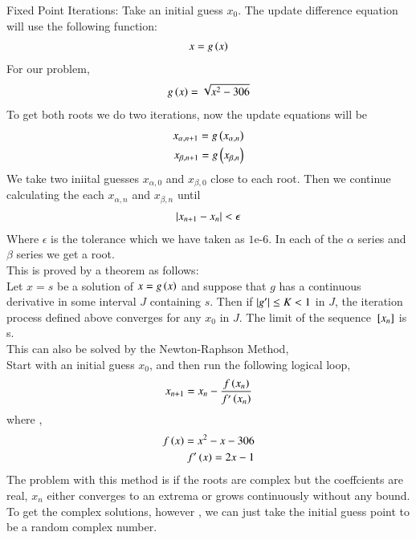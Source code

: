 \documentclass[journal]{IEEEtran}
\begin{document}
Fixed Point Iterations:
Take an initial guess $x_0$. The update difference equation will use the following function:
\begin{align}
    x = g\left(x\right)
\end{align}
For our problem,
\begin{align}
    g\left(x\right) = \sqrt{x^2-306}
\end{align}
To get both roots we do two iterations, now the update equations will be
\begin{align}
    x_{\alpha,n+1}=g\left(x_{\alpha,n}\right)\\
    x_{\beta,n+1}=g\left(x_{\beta,n}\right)\\
\end{align}
We take two iniital guesses $x_{\alpha,0}$ and $x_{\beta,0}$ close to each root. Then we continue calculating the each $x_{\alpha,n}$ and $x_{\beta,n}$ until
\begin{align}
    \left\vert x_{n+1}-x_n\right\vert<\epsilon
\end{align}
Where $\epsilon$ is the tolerance which we have taken as $1\text{e-}6$. In each of the $\alpha$ series and $\beta$ series we get a root.\\
\newline
This is proved by a theorem as follows:\\
Let $x = s$ be a solution of $x = g\left(x\right)$ and suppose that $g$ has a continuous
derivative in some interval $J$ containing $s$. Then if $\left\vert g^{\prime}\right\vert \le K < 1$ in $J$,
the iteration process defined  above converges for any $x_0$ in $J$. The limit of the sequence
${}\left[x_n\right]$ is s.\\
\newline
This can also be solved by the Newton-Raphson Method,\\
Start with an initial guess $x_0$, and then run the following logical loop,
\begin{align}
    x_{n+1} = x_n - \frac{f\left(x_n\right)}{f^{\prime}\left(x_n\right)} 
\end{align}
where ,
\begin{align}
    f\left(x\right) = x^2 - x - 306\\
    f^{\prime}\left(x\right) = 2x-1
\end{align}
\newline
The problem with this method is if the roots are complex but the coeffcients are real, $x_n$ either converges to an extrema or grows continuously without any bound.
To get the complex solutions, however , we can just take the initial guess point to be a 
random complex number.\\
\end{document}
